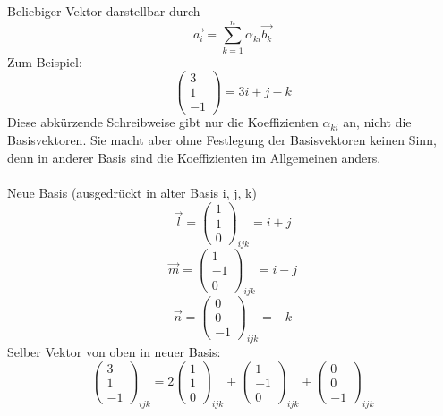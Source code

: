 \documentclass{article}
\begin{document}
Beliebiger Vektor darstellbar durch
\begin{equation*}
    \vec{a_i}=\sum_{k=1}^{n}\alpha_{ki}\vec{b_k}
\end{equation*}
Zum Beispiel:
\begin{equation*}
    \left(\begin{array}{c}
        3 \\ 1 \\ -1
    \end{array}\right) = 3i + j - k
\end{equation*}
Diese abkürzende Schreibweise gibt nur die Koeffizienten $\alpha_{ki}$ an, nicht die Basisvektoren. Sie macht aber ohne Festlegung der Basisvektoren keinen Sinn, denn in anderer Basis sind die Koeffizienten im Allgemeinen anders.\\
\\
Neue Basis (ausgedrückt in alter Basis i, j, k)
\begin{equation*}
    \vec{l}=\left(\begin{array}{c}
        1 \\ 1 \\ 0
    \end{array}\right)_{ijk} = i + j 
\end{equation*}
\begin{equation*}
    \vec{m}=\left(\begin{array}{c}
        1 \\ -1 \\ 0
    \end{array}\right)_{ijk} = i - j
\end{equation*}
\begin{equation*}
    \vec{n}=\left(\begin{array}{c}
        0 \\ 0 \\ -1
    \end{array}\right)_{ijk} = -k
\end{equation*}
Selber Vektor von oben in neuer Basis:
\begin{equation*}
    \left(\begin{array}{c}
        3 \\ 1 \\ -1
    \end{array}\right)_{ijk} = 2 \left(\begin{array}{c}
        1 \\ 1 \\ 0
    \end{array}\right)_{ijk} + \left(\begin{array}{c}
        1 \\ -1 \\ 0
    \end{array}\right)_{ijk} + \left(\begin{array}{c}
        0 \\ 0 \\ -1
    \end{array}\right)_{ijk}
\end{equation*}
\end{document}
